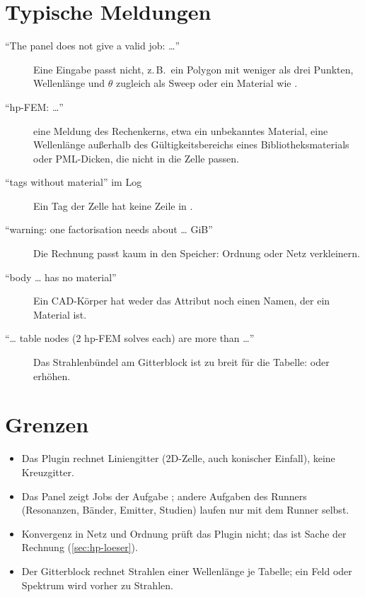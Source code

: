 \section{Typische Meldungen}\label{sec:hp-fehler}

\begin{description}
  \item[\enquote{The panel does not give a valid job: …}] Eine Eingabe passt nicht, z.\,B.\ ein
    Polygon mit weniger als drei Punkten, Wellenlänge und $\theta$ zugleich als Sweep oder ein
    Material wie .
  \item[\enquote{hp-FEM: …}] eine Meldung des Rechenkerns, etwa ein unbekanntes Material, eine
    Wellenlänge außerhalb des Gültigkeitsbereichs eines Bibliotheksmaterials oder PML-Dicken, die
    nicht in die Zelle passen.
  \item[\enquote{tags without material} im Log] Ein Tag der Zelle hat keine Zeile in
    .
  \item[\enquote{warning: one factorisation needs about … GiB}] Die Rechnung passt kaum in den
    Speicher: Ordnung oder Netz verkleinern.
  \item[\enquote{body … has no material}] Ein CAD-Körper hat weder das Attribut 
    noch einen Namen, der ein Material ist.
  \item[\enquote{… table nodes (2 hp-FEM solves each) are more than …}] Das Strahlenbündel am
    Gitterblock ist zu breit für die Tabelle:  oder  erhöhen.
\end{description}

\section{Grenzen}\label{sec:hp-grenzen}

\begin{itemize}
  \item Das Plugin rechnet Liniengitter (2D-Zelle, auch konischer Einfall), keine Kreuzgitter.
  \item Das Panel zeigt Jobs der Aufgabe ; andere Aufgaben des Runners (Resonanzen,
    Bänder, Emitter, Studien) laufen nur mit dem Runner selbst.
  \item Konvergenz in Netz und Ordnung prüft das Plugin nicht; das ist Sache der Rechnung
    (\autoref{sec:hp-loeser}).
  \item Der Gitterblock rechnet Strahlen einer Wellenlänge je Tabelle; ein Feld oder Spektrum wird
    vorher zu Strahlen.
\end{itemize}

